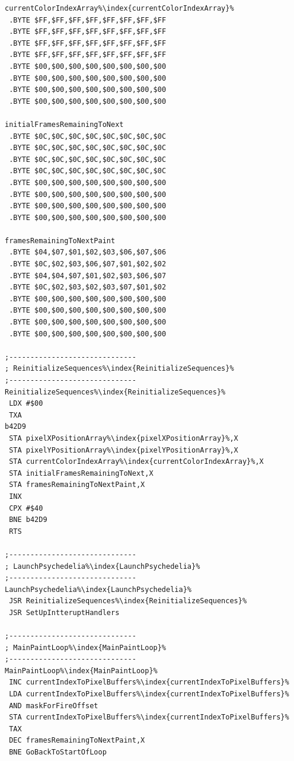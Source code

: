\begin{minipage}[b]{0.33\linewidth}
\begin{lrbox}{\mybox}%
\begin{lstlisting}[basicstyle=\ttfamily\tiny,escapechar=\%]
currentColorIndexArray%\index{currentColorIndexArray}%   
 .BYTE $FF,$FF,$FF,$FF,$FF,$FF,$FF,$FF
 .BYTE $FF,$FF,$FF,$FF,$FF,$FF,$FF,$FF
 .BYTE $FF,$FF,$FF,$FF,$FF,$FF,$FF,$FF
 .BYTE $FF,$FF,$FF,$FF,$FF,$FF,$FF,$FF
 .BYTE $00,$00,$00,$00,$00,$00,$00,$00
 .BYTE $00,$00,$00,$00,$00,$00,$00,$00
 .BYTE $00,$00,$00,$00,$00,$00,$00,$00
 .BYTE $00,$00,$00,$00,$00,$00,$00,$00

initialFramesRemainingToNext   
 .BYTE $0C,$0C,$0C,$0C,$0C,$0C,$0C,$0C
 .BYTE $0C,$0C,$0C,$0C,$0C,$0C,$0C,$0C
 .BYTE $0C,$0C,$0C,$0C,$0C,$0C,$0C,$0C
 .BYTE $0C,$0C,$0C,$0C,$0C,$0C,$0C,$0C
 .BYTE $00,$00,$00,$00,$00,$00,$00,$00
 .BYTE $00,$00,$00,$00,$00,$00,$00,$00
 .BYTE $00,$00,$00,$00,$00,$00,$00,$00
 .BYTE $00,$00,$00,$00,$00,$00,$00,$00

framesRemainingToNextPaint   
 .BYTE $04,$07,$01,$02,$03,$06,$07,$06
 .BYTE $0C,$02,$03,$06,$07,$01,$02,$02
 .BYTE $04,$04,$07,$01,$02,$03,$06,$07
 .BYTE $0C,$02,$03,$02,$03,$07,$01,$02
 .BYTE $00,$00,$00,$00,$00,$00,$00,$00
 .BYTE $00,$00,$00,$00,$00,$00,$00,$00
 .BYTE $00,$00,$00,$00,$00,$00,$00,$00
 .BYTE $00,$00,$00,$00,$00,$00,$00,$00

;------------------------------
; ReinitializeSequences%\index{ReinitializeSequences}%
;------------------------------
ReinitializeSequences%\index{ReinitializeSequences}%   
 LDX #$00
 TXA 
b42D9   
 STA pixelXPositionArray%\index{pixelXPositionArray}%,X
 STA pixelYPositionArray%\index{pixelYPositionArray}%,X
 STA currentColorIndexArray%\index{currentColorIndexArray}%,X
 STA initialFramesRemainingToNext,X
 STA framesRemainingToNextPaint,X
 INX 
 CPX #$40
 BNE b42D9
 RTS 

;------------------------------
; LaunchPsychedelia%\index{LaunchPsychedelia}%
;------------------------------
LaunchPsychedelia%\index{LaunchPsychedelia}%   
 JSR ReinitializeSequences%\index{ReinitializeSequences}%
 JSR SetUpIntteruptHandlers

;------------------------------
; MainPaintLoop%\index{MainPaintLoop}%
;------------------------------
MainPaintLoop%\index{MainPaintLoop}%   
 INC currentIndexToPixelBuffers%\index{currentIndexToPixelBuffers}%
 LDA currentIndexToPixelBuffers%\index{currentIndexToPixelBuffers}%
 AND maskForFireOffset
 STA currentIndexToPixelBuffers%\index{currentIndexToPixelBuffers}%
 TAX 
 DEC framesRemainingToNextPaint,X
 BNE GoBackToStartOfLoop


\end{lstlisting}
\end{lrbox}
\end{minipage}
